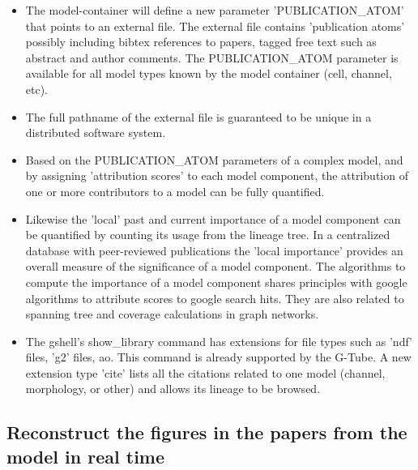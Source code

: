 \documentclass[12pt]{article}
\begin{document}
\begin{itemize}
\item The model-container will define a new parameter
  'PUBLICATION\_ATOM' that points to an external file.  The external
  file contains 'publication atoms' possibly including bibtex
  references to papers, tagged free text such as abstract and author
  comments.  The PUBLICATION\_ATOM parameter is available for all
  model types known by the model container (cell, channel, etc).
\item The full pathname of the external file is guaranteed to be
  unique in a distributed software system.
\item Based on the PUBLICATION\_ATOM parameters of a complex model,
  and by assigning 'attribution scores' to each model component, the
  attribution of one or more contributors to a model can be fully
  quantified.
\item Likewise the 'local' past and current importance of a model
  component can be quantified by counting its usage from the lineage
  tree.  In a centralized database with peer-reviewed publications the
  'local importance' provides an overall measure of the significance
  of a model component.  The algorithms to compute the importance of a
  model component shares principles with google algorithms to
  attribute scores to google search hits.  They are also related to
  spanning tree and coverage calculations in graph networks.
\item The gshell's show\_library command has extensions for file types
  such as 'ndf' files, 'g2' files, ao.  This command is already
  supported by the G-Tube.  A new extension type 'cite' lists all the
  citations related to one model (channel, morphology, or other) and
  allows its lineage to be browsed.
\end{itemize}


\subsection{Reconstruct the figures in the papers from the model in real time}
\end{document}
